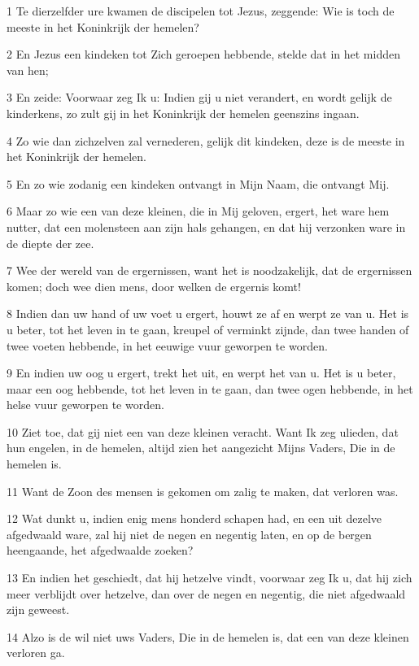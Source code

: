 \par 1 Te dierzelfder ure kwamen de discipelen tot Jezus, zeggende: Wie is toch de meeste in het Koninkrijk der hemelen?
\par 2 En Jezus een kindeken tot Zich geroepen hebbende, stelde dat in het midden van hen;
\par 3 En zeide: Voorwaar zeg Ik u: Indien gij u niet verandert, en wordt gelijk de kinderkens, zo zult gij in het Koninkrijk der hemelen geenszins ingaan.
\par 4 Zo wie dan zichzelven zal vernederen, gelijk dit kindeken, deze is de meeste in het Koninkrijk der hemelen.
\par 5 En zo wie zodanig een kindeken ontvangt in Mijn Naam, die ontvangt Mij.
\par 6 Maar zo wie een van deze kleinen, die in Mij geloven, ergert, het ware hem nutter, dat een molensteen aan zijn hals gehangen, en dat hij verzonken ware in de diepte der zee.
\par 7 Wee der wereld van de ergernissen, want het is noodzakelijk, dat de ergernissen komen; doch wee dien mens, door welken de ergernis komt!
\par 8 Indien dan uw hand of uw voet u ergert, houwt ze af en werpt ze van u. Het is u beter, tot het leven in te gaan, kreupel of verminkt zijnde, dan twee handen of twee voeten hebbende, in het eeuwige vuur geworpen te worden.
\par 9 En indien uw oog u ergert, trekt het uit, en werpt het van u. Het is u beter, maar een oog hebbende, tot het leven in te gaan, dan twee ogen hebbende, in het helse vuur geworpen te worden.
\par 10 Ziet toe, dat gij niet een van deze kleinen veracht. Want Ik zeg ulieden, dat hun engelen, in de hemelen, altijd zien het aangezicht Mijns Vaders, Die in de hemelen is.
\par 11 Want de Zoon des mensen is gekomen om zalig te maken, dat verloren was.
\par 12 Wat dunkt u, indien enig mens honderd schapen had, en een uit dezelve afgedwaald ware, zal hij niet de negen en negentig laten, en op de bergen heengaande, het afgedwaalde zoeken?
\par 13 En indien het geschiedt, dat hij hetzelve vindt, voorwaar zeg Ik u, dat hij zich meer verblijdt over hetzelve, dan over de negen en negentig, die niet afgedwaald zijn geweest.
\par 14 Alzo is de wil niet uws Vaders, Die in de hemelen is, dat een van deze kleinen verloren ga.
